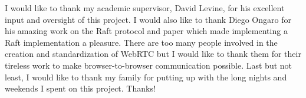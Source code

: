 \documentclass[conference,compsoc]{./IEEEtran/IEEEtran}
\begin{document}
I would like to thank my academic supervisor, David Levine, for his excellent input and oversight of this project. I would also like to thank Diego Ongaro for his amazing work on the Raft protocol and paper which made implementing a Raft implementation a pleasure.  There are too many people involved in the creation and standardization of WebRTC but I would like to thank them for their tireless work to make browser-to-browser communication possible. Last but not least, I would like to thank my family for putting up with the long nights and weekends I spent on this project. Thanks!



\end{document}
